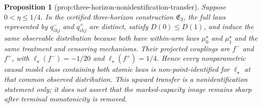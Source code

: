\documentclass{article}
\newtheorem{proposition}{Proposition}
\begin{document}
\begin{proposition}[prop:three-horizon-nonidentification-transfer]\label{prop:three-horizon-nonidentification-transfer}
Suppose \(0<\eta\leq1/4\).  In the certified three-horizon construction \(\mathfrak E_3\), the full laws represented by \(q^-_{ihj}\) and \(q^+_{ihj}\) are distinct, satisfy \(D(0)\leq D(1)\), and induce the same observable distribution because both have within-arm laws \(\mu_0^\star\) and \(\mu_1^\star\) and the same treatment and censoring mechanisms.  Their projected couplings are \(f^-\) and \(f^+\), with \(\ell_\star(f^-)=-1/20\) and \(\ell_\star(f^+)=1/4\).  Hence every nonparametric causal model class containing both atomic laws is non-point-identified for \(\ell_\star\) at that common observed distribution.  This upward transfer is a nonidentification statement only; it does not assert that the marked-capacity image remains sharp after terminal monotonicity is removed.
\end{proposition}
\end{document}
